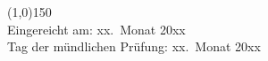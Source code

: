 {\begin{center}
		\begin{flushleft}\hspace*{12mm}\METAsupervisorc\dotfill\end{flushleft}
	\line(1,0){150}\\ \null
		Eingereicht am:  xx.\ Monat 20xx\\
		Tag der m\"undlichen Pr\"ufung: xx.\ Monat 20xx  \\
\end{center}}
%
\cleardoublepage		
\thispagestyle{empty}
